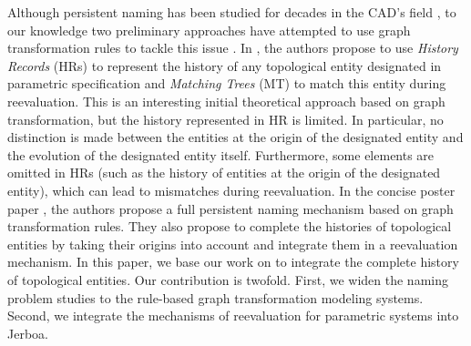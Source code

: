 Although persistent naming has been studied for decades in the CAD's
 field \cite{KRIPAC1997,CAPOYLEAS199617,wu2001face,wang2005geometry,bidarra2005feature,mun05,mar06,baba10,xue16,farjana2018mechanisms},
 to our knowledge
two preliminary approaches have attempted to use graph transformation rules to tackle this issue \cite{cardot2019persistent,gaide2023model}.
In \cite{cardot2019persistent}, the authors propose to use \emph{History Records} (HRs) to represent the history of any topological entity designated in parametric specification and \emph{Matching Trees} (MT) to match this entity during reevaluation. %
This is an interesting initial theoretical approach based on graph transformation, but the history represented in HR is limited. %
In particular, no distinction is made between the entities at the origin of the designated entity and the evolution of the designated entity itself. %
Furthermore, some elements are omitted in HRs (such as the history of entities at the origin of the designated entity), which can lead to mismatches during reevaluation.
In the concise poster paper \cite{gaide2023model}, the authors propose a full persistent naming mechanism based on graph transformation rules. %
They also propose to complete the histories of topological entities by taking their origins into account and integrate them in a reevaluation mechanism. %
In this paper, we base our work on \cite{gaide2023model} to integrate the complete history of topological entities. %
Our contribution is twofold. First, we widen the naming problem studies to the rule-based graph transformation modeling systems.
Second, we integrate the mechanisms of reevaluation for parametric systems into Jerboa.

